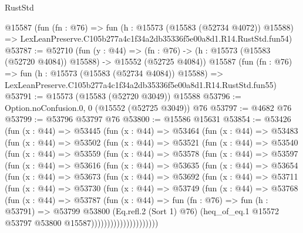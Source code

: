 \begin{lexlean}{RustStd}
\begin{coremodule}
    @15587
    (fun (fn : @76) =>
    fun (h : @15573 (@15583 (@52734 @4072)) @15588) =>
    LexLeanPreserve.C105b277a4c1f34a2db35336f5e00a8d1.R14.RustStd.fun54)
@53787 := @52710
    (fun (y : @44) =>
    (fn : @76) -> (h : @15573 (@15583 (@52720 @4084)) @15588) -> @15552 (@52725 @4084))
    @15587
    (fun (fn : @76) =>
    fun (h : @15573 (@15583 (@52734 @4084)) @15588) =>
    LexLeanPreserve.C105b277a4c1f34a2db35336f5e00a8d1.R14.RustStd.fun55)
@53791 := @15573 (@15583 (@52720 @3049)) @15588
@53796 := Option.noConfusion.{0, 0} (@15552 (@52725 @3049)) @76
@53797 := @4682 @76
@53799 := @53796 @53797 @76
@53800 := @15586 @15631
@53854 := @53426
    (fun (x : @44) =>
    @53445
      (fun (x : @44) =>
      @53464
        (fun (x : @44) =>
        @53483
          (fun (x : @44) =>
          @53502
            (fun (x : @44) =>
            @53521
              (fun (x : @44) =>
              @53540
                (fun (x : @44) =>
                @53559
                  (fun (x : @44) =>
                  @53578
                    (fun (x : @44) =>
                    @53597
                      (fun (x : @44) =>
                      @53616
                        (fun (x : @44) =>
                        @53635
                          (fun (x : @44) =>
                          @53654
                            (fun (x : @44) =>
                            @53673
                              (fun (x : @44) =>
                              @53692
                                (fun (x : @44) =>
                                @53711
                                  (fun (x : @44) =>
                                  @53730
                                    (fun (x : @44) =>
                                    @53749
                                      (fun (x : @44) =>
                                      @53768
                                        (fun (x : @44) =>
                                        @53787
                                          (fun (x : @44) =>
                                          fun (fn : @76) =>
                                          fun (h : @53791) =>
                                          @53799
                                            @53800
                                            (Eq.refl.{2} (Sort 1) @76)
                                            (heq_of_eq.{1}
                                              @15572
                                              @53797
                                              @53800
                                              @15587)))))))))))))))))))))

\end{coremodule}
\end{lexlean}
